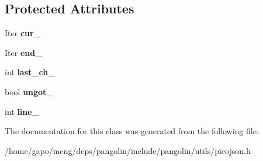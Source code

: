 \subsection*{Protected Attributes}
\begin{DoxyCompactItemize}
\item 
Iter {\bfseries cur\+\_\+}\hypertarget{classpangolin_1_1json_1_1input_aec2f56bf8a745cea869fdc0b827461da}{}\label{classpangolin_1_1json_1_1input_aec2f56bf8a745cea869fdc0b827461da}

\item 
Iter {\bfseries end\+\_\+}\hypertarget{classpangolin_1_1json_1_1input_a596b64d7e2a1840768ac50ed795b6c8a}{}\label{classpangolin_1_1json_1_1input_a596b64d7e2a1840768ac50ed795b6c8a}

\item 
int {\bfseries last\+\_\+ch\+\_\+}\hypertarget{classpangolin_1_1json_1_1input_a93f0fe1c1757e801b91ca9251fb5b6f3}{}\label{classpangolin_1_1json_1_1input_a93f0fe1c1757e801b91ca9251fb5b6f3}

\item 
bool {\bfseries ungot\+\_\+}\hypertarget{classpangolin_1_1json_1_1input_a5ef4aedb53fa2f67603cc2bf8fd86f70}{}\label{classpangolin_1_1json_1_1input_a5ef4aedb53fa2f67603cc2bf8fd86f70}

\item 
int {\bfseries line\+\_\+}\hypertarget{classpangolin_1_1json_1_1input_a6b44d960882efce51998657716c307fc}{}\label{classpangolin_1_1json_1_1input_a6b44d960882efce51998657716c307fc}

\end{DoxyCompactItemize}


The documentation for this class was generated from the following file\+:\begin{DoxyCompactItemize}
\item 
/home/gapo/meng/deps/pangolin/include/pangolin/utils/picojson.\+h\end{DoxyCompactItemize}
